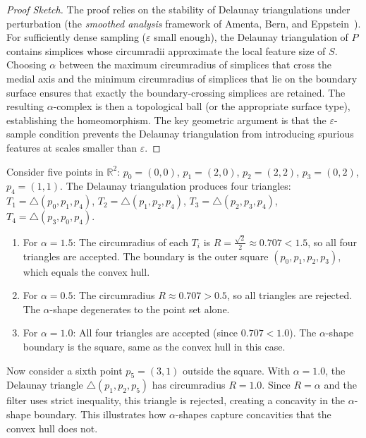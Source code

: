 \begin{proof}[Proof Sketch]
The proof relies on the stability of Delaunay triangulations under perturbation (the \emph{smoothed analysis} framework of Amenta, Bern, and Eppstein~\cite{amenta1998}). For sufficiently dense sampling ($\varepsilon$ small enough), the Delaunay triangulation of $P$ contains simplices whose circumradii approximate the local feature size of $S$. Choosing $\alpha$ between the maximum circumradius of simplices that cross the medial axis and the minimum circumradius of simplices that lie on the boundary surface ensures that exactly the boundary-crossing simplices are retained. The resulting $\alpha$-complex is then a topological ball (or the appropriate surface type), establishing the homeomorphism. The key geometric argument is that the $\varepsilon$-sample condition prevents the Delaunay triangulation from introducing spurious features at scales smaller than $\varepsilon$.
\end{proof}

\begin{example}\label{ex:alpha_shape_five}
Consider five points in $\mathbb{R}^2$: $p_0 = (0,0)$, $p_1 = (2,0)$, $p_2 = (2,2)$, $p_3 = (0,2)$, $p_4 = (1,1)$. The Delaunay triangulation produces four triangles: $T_1 = \triangle(p_0, p_1, p_4)$, $T_2 = \triangle(p_1, p_2, p_4)$, $T_3 = \triangle(p_2, p_3, p_4)$, $T_4 = \triangle(p_3, p_0, p_4)$.
\begin{enumerate}
\item For $\alpha = 1.5$: The circumradius of each $T_i$ is $R = \frac{\sqrt{2}}{2} \approx 0.707 < 1.5$, so all four triangles are accepted. The boundary is the outer square $(p_0, p_1, p_2, p_3)$, which equals the convex hull.
\item For $\alpha = 0.5$: The circumradius $R \approx 0.707 > 0.5$, so all triangles are rejected. The $\alpha$-shape degenerates to the point set alone.
\item For $\alpha = 1.0$: All four triangles are accepted (since $0.707 < 1.0$). The $\alpha$-shape boundary is the square, same as the convex hull in this case.
\end{enumerate}
Now consider a sixth point $p_5 = (3, 1)$ outside the square. With $\alpha = 1.0$, the Delaunay triangle $\triangle(p_1, p_2, p_5)$ has circumradius $R = 1.0$. Since $R = \alpha$ and the filter uses strict inequality, this triangle is rejected, creating a concavity in the $\alpha$-shape boundary. This illustrates how $\alpha$-shapes capture concavities that the convex hull does not.
\end{example}

